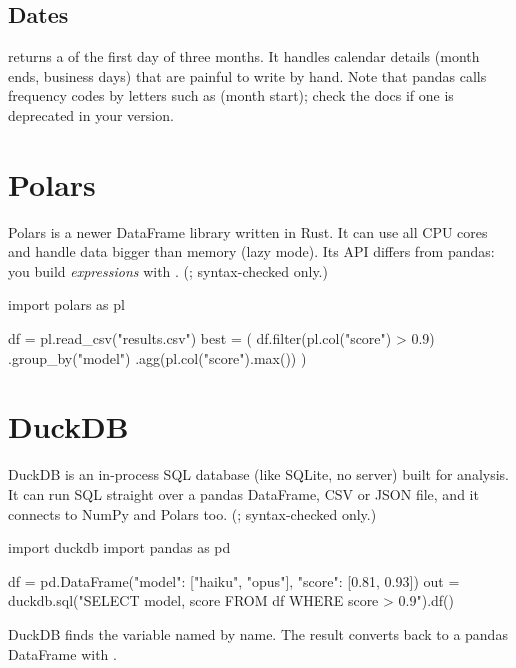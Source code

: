 \subsection{Dates}

 returns a  of the
first day of three months. It handles calendar details (month ends, business days) that are
painful to write by hand. Note that pandas calls frequency codes by letters such as 
(month start); check the docs if one is deprecated in your version.

\section{Polars}

Polars is a newer DataFrame library written in Rust. It can use all CPU cores and handle data
bigger than memory (lazy mode). Its API differs from pandas: you build \emph{expressions} with
. (; syntax-checked only.)

\begin{pycode}
import polars as pl

df = pl.read_csv("results.csv")
best = (
    df.filter(pl.col("score") > 0.9)
      .group_by("model")
      .agg(pl.col("score").max())
)
\end{pycode}

\section{DuckDB}

DuckDB is an in-process SQL database (like SQLite, no server) built for analysis. It can run SQL
straight over a pandas DataFrame, CSV or JSON file, and it connects to NumPy and Polars too.
(; syntax-checked only.)

\begin{pycode}
import duckdb
import pandas as pd

df = pd.DataFrame({"model": ["haiku", "opus"], "score": [0.81, 0.93]})
out = duckdb.sql("SELECT model, score FROM df WHERE score > 0.9").df()
\end{pycode}

DuckDB finds the variable named  by name. The result converts back to a pandas DataFrame
with .

